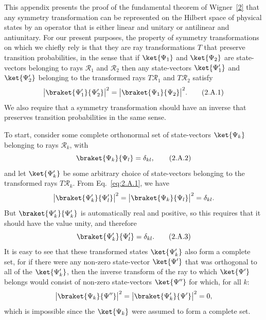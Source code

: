 

This appendix presents the proof of the fundamental theorem of
Wigner~\hyperref[ref:2.2]{[2]} that any symmetry transformation can be
represented on the Hilbert space of physical states by an operator that is
either linear and unitary or antilinear and antiunitary. For our present
purposes, the property of symmetry transformations on which we chiefly rely
is that they are ray transformations $T$ that preserve transition
probabilities, in the sense that if $\ket{\Psi_1}$ and $\ket{\Psi_2}$ are
state-vectors belonging to rays $\mathcal{R}_1$ and $\mathcal{R}_2$ then any
state-vectors $\ket{\Psi'_1}$ and $\ket{\Psi'_2}$ belonging to the
transformed rays $T\mathcal{R}_1$ and $T\mathcal{R}_2$ satisfy
\begin{equation}
  \bigl|\braket{\Psi'_1}{\Psi'_2}\bigr|^2
    =\bigl|\braket{\Psi_1}{\Psi_2}\bigr|^2.
  \tag{2.A.1}\label{eq:2.A.1}
\end{equation}
We also require that a symmetry transformation should have an inverse that
preserves transition probabilities in the same sense.

To start, consider some complete orthonormal set of state-vectors
$\ket{\Psi_k}$ belonging to rays $\mathcal{R}_k$, with
\begin{equation}
  \braket{\Psi_k}{\Psi_l}=\delta_{kl},
  \tag{2.A.2}\label{eq:2.A.2}
\end{equation}
and let $\ket{\Psi'_k}$ be some arbitrary choice of state-vectors belonging
to the transformed rays $T\mathcal{R}_k$. From Eq.~\eqref{eq:2.A.1}, we have
\begin{equation*}
  \bigl|\braket{\Psi'_k}{\Psi'_l}\bigr|^2
    =\bigl|\braket{\Psi_k}{\Psi_l}\bigr|^2
    =\delta_{kl}.
\end{equation*}
But $\braket{\Psi'_k}{\Psi'_k}$ is automatically real and positive, so
this requires that it should have the value unity, and therefore
\begin{equation}
  \braket{\Psi'_k}{\Psi'_l}=\delta_{kl}.
  \tag{2.A.3}\label{eq:2.A.3}
\end{equation}
It is easy to see that these transformed states $\ket{\Psi'_k}$ also form
a complete set, for if there were any non-zero state-vector $\ket{\Psi'}$
that was orthogonal to all of the $\ket{\Psi'_k}$, then the inverse
transform of the ray to which $\ket{\Psi'}$ belongs would consist of
non-zero state-vectors $\ket{\Psi''}$ for which, for all $k$:
\begin{equation*}
  \bigl|\braket{\Psi_k}{\Psi''}\bigr|^2
    =\bigl|\braket{\Psi'_k}{\Psi'}\bigr|^2=0,
\end{equation*}
which is impossible since the $\ket{\Psi_k}$ were assumed to form a
complete set.

